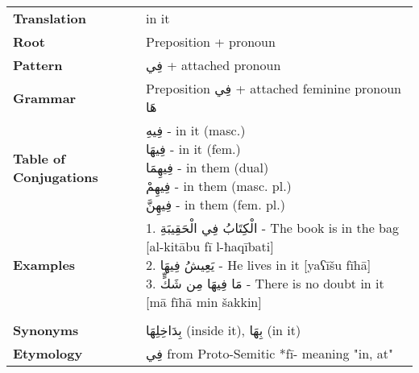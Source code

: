 \documentclass[letter,12pt]{article}
\begin{document}
\begin{tabular}{p{3cm}p{10cm}}
\toprule
\textbf{Translation} & in it \\
\textbf{Root} & Preposition + pronoun \\
\textbf{Pattern} & \textarabic{فِي} + attached pronoun \\
\textbf{Grammar} & Preposition \textarabic{فِي} + attached feminine pronoun \textarabic{هَا} \\
\textbf{Table of Conjugations} & \makecell[l]{
\textarabic{فِيهِ} - in it (masc.)\\
\textarabic{فِيهَا} - in it (fem.)\\
\textarabic{فِيهِمَا} - in them (dual)\\
\textarabic{فِيهِمْ} - in them (masc. pl.)\\
\textarabic{فِيهِنَّ} - in them (fem. pl.)
} \\
\textbf{Examples} & \makecell[l]{\parbox{9.5cm}{
1. \textarabic{الْكِتَابُ فِي الْحَقِيبَةِ} - The book is in the bag [al-kitābu fī l-ħaqībati]\\
2. \textarabic{يَعِيشُ فِيهَا} - He lives in it [yaʕīšu fīhā]\\
3. \textarabic{مَا فِيهَا مِن شَكٍّ} - There is no doubt in it [mā fīhā min šakkin]
}} \\
\midrule \\
\textbf{Synonyms} & \textarabic{بِدَاخِلِهَا} (inside it), \textarabic{بِهَا} (in it) \\
\textbf{Etymology} & \textarabic{فِي} from Proto-Semitic *fī- meaning "in, at" \\
\bottomrule
\end{tabular}

\end{document}
